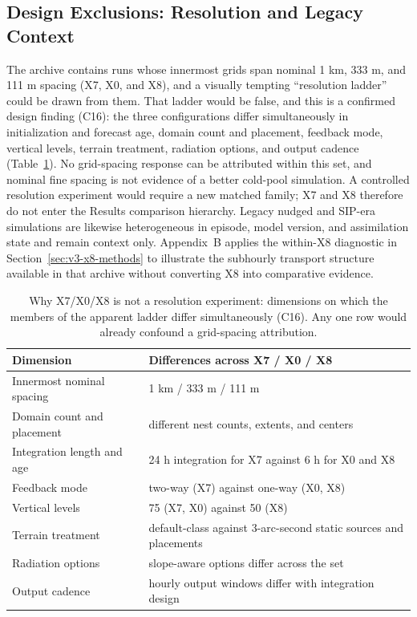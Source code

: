 \documentclass[air,article,submit,moreauthors]{Definitions/mdpi}
\begin{document}
\subsection{Design Exclusions: Resolution and Legacy Context}
\label{sec:v3-resolution}

The archive contains runs whose innermost grids span nominal 1 km, 333 m, and 111 m spacing (X7, X0, and X8), and a visually tempting ``resolution ladder'' could be drawn from them.
That ladder would be false, and this is a confirmed design finding (C16): the three configurations differ simultaneously in initialization and forecast age, domain count and placement, feedback mode, vertical levels, terrain treatment, radiation options, and output cadence (Table~\ref{tab:v3-confounds}).
No grid-spacing response can be attributed within this set, and nominal fine spacing is not evidence of a better cold-pool simulation.
A controlled resolution experiment would require a new matched family; X7 and X8 therefore do not enter the Results comparison hierarchy.
Legacy nudged and SIP-era simulations are likewise heterogeneous in episode, model version, and assimilation state and remain context only.
Appendix~B applies the within-X8 diagnostic in Section~\ref{sec:v3-x8-methods} to illustrate the subhourly transport structure available in that archive without converting X8 into comparative evidence.

\begin{table}[H]
\caption{Why X7/X0/X8 is not a resolution experiment: dimensions on which the members of the apparent ladder differ simultaneously (C16).
Any one row would already confound a grid-spacing attribution.}
\label{tab:v3-confounds}
\centering
\small
\begin{tabular}{lp{8.6cm}}
\toprule
Dimension & Differences across X7 / X0 / X8 \\
\midrule
Innermost nominal spacing & 1 km / 333 m / 111 m \\
Domain count and placement & different nest counts, extents, and centers \\
Integration length and age & 24 h integration for X7 against 6 h for X0 and X8 \\
Feedback mode & two-way (X7) against one-way (X0, X8) \\
Vertical levels & 75 (X7, X0) against 50 (X8) \\
Terrain treatment & default-class against 3-arc-second static sources and placements \\
Radiation options & slope-aware options differ across the set \\
Output cadence & hourly output windows differ with integration design \\
\bottomrule
\end{tabular}
\end{table}
\end{document}
